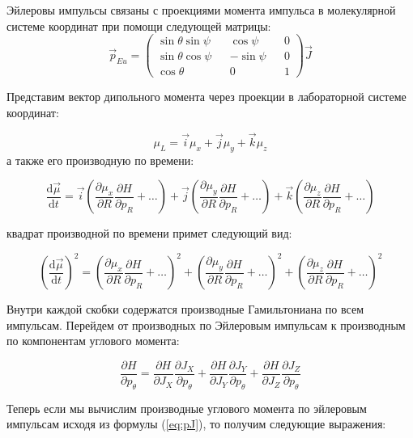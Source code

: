 Эйлеровы импульсы связаны с проекциями момента импульса в молекулярной системе координат при помощи следующей матрицы:
\begin{equation}
\label{eq:pJ}
\vec p_{Eu} = \left( \begin{matrix} \sin\theta \sin\psi && \cos\psi && 0 \\
 \sin\theta \cos\psi && -\sin\psi && 0 \\
 \cos\theta  && 0 && 1
  \end{matrix} \right) \vec J
\end{equation}

Представим вектор дипольного момента через проекции в лабораторной системе координат:

\[
\mu_L = \vec i\mu_x + \vec j\mu_y + \vec k\mu_z
\]
а также его производную по времени:

\[
\frac{\mathrm{d}\vec\mu}{\mathrm{d} t} =  \vec i \left( \frac{\partial \mu_{x}}{\partial R}\frac{\partial H}{\partial p_R} + \ldots \right) +
 \vec j \left( \frac{\partial \mu_{y}}{\partial R}\frac{\partial H}{\partial p_R} + \ldots \right) +
  \vec k \left( \frac{\partial \mu_{z}}{\partial R}\frac{\partial H}{\partial p_R} + \ldots \right)
\]

квадрат производной по времени примет следующий вид:

\begin{equation}
\label{eq:squared}
\left(\frac{\mathrm{d}\vec\mu}{\mathrm{d} t}\right)^2 =   \left( \frac{\partial \mu_{x}}{\partial R}\frac{\partial H}{\partial p_R} + \ldots \right)^2 +
  \left( \frac{\partial \mu_{y}}{\partial R}\frac{\partial H}{\partial p_R} + \ldots \right)^2 +
   \left( \frac{\partial \mu_{z}}{\partial R}\frac{\partial H}{\partial p_R} + \ldots \right)^2
\end{equation}


Внутри каждой скобки содержатся производные Гамильтониана по всем импульсам. Перейдем от производных по Эйлеровым импульсам к производным по компонентам углового момента:

\[
\frac{\partial H}{\partial p_{\theta}} = 
\frac{\partial H}{\partial J_X}\frac{\partial J_X}{\partial p_{\theta}} +
\frac{\partial H}{\partial J_Y}\frac{\partial J_Y}{\partial p_{\theta}} + 
\frac{\partial H}{\partial J_Z}\frac{\partial J_Z}{\partial p_{\theta}}
\]

Теперь если мы вычислим производные углового момента по эйлеровым импульсам исходя из формулы (\ref{eq:pJ}), то получим следующие выражения:

